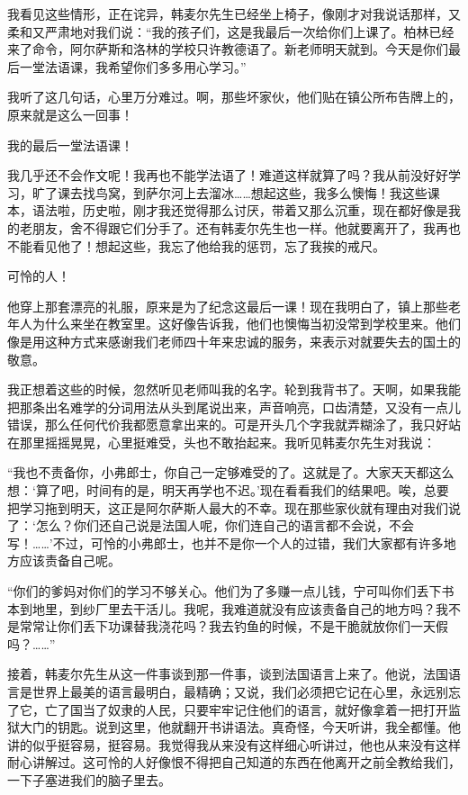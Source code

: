 \documentclass[12pt,UTF-8,openany]{ctexbook}
\begin{document}
\begin{normalsize}
    我看见这些情形，正在诧异，韩麦尔先生已经坐上椅子，像刚才对我说话那样，又柔和又严肃地对我们说：“我的孩子们，这是我最后一次给你们上课了。柏林已经来了命令，阿尔萨斯和洛林的学校只许教德语了。新老师明天就到。今天是你们最后一堂法语课，我希望你们多多用心学习。”
    
    我听了这几句话，心里万分难过。啊，那些坏家伙，他们贴在镇公所布告牌上的，原来就是这么一回事！
    
    我的最后一堂法语课！
    
    我几乎还不会作文呢！我再也不能学法语了！难道这样就算了吗？我从前没好好学习，旷了课去找鸟窝，到萨尔河上去溜冰……想起这些，我多么懊悔！我这些课本，语法啦，历史啦，刚才我还觉得那么讨厌，带着又那么沉重，现在都好像是我的老朋友，舍不得跟它们分手了。还有韩麦尔先生也一样。他就要离开了，我再也不能看见他了！想起这些，我忘了他给我的惩罚，忘了我挨的戒尺。
    
    可怜的人！
    
    他穿上那套漂亮的礼服，原来是为了纪念这最后一课！现在我明白了，镇上那些老年人为什么来坐在教室里。这好像告诉我，他们也懊悔当初没常到学校里来。他们像是用这种方式来感谢我们老师四十年来忠诚的服务，来表示对就要失去的国土的敬意。
    
    我正想着这些的时候，忽然听见老师叫我的名字。轮到我背书了。天啊，如果我能把那条出名难学的分词用法从头到尾说出来，声音响亮，口齿清楚，又没有一点儿错误，那么任何代价我都愿意拿出来的。可是开头几个字我就弄糊涂了，我只好站在那里摇摇晃晃，心里挺难受，头也不敢抬起来。我听见韩麦尔先生对我说：
    
    “我也不责备你，小弗郎士，你自己一定够难受的了。这就是了。大家天天都这么想：‘算了吧，时间有的是，明天再学也不迟。’现在看看我们的结果吧。唉，总要把学习拖到明天，这正是阿尔萨斯人最大的不幸。现在那些家伙就有理由对我们说了：‘怎么？你们还自己说是法国人呢，你们连自己的语言都不会说，不会写！……’不过，可怜的小弗郎士，也并不是你一个人的过错，我们大家都有许多地方应该责备自己呢。
    
    “你们的爹妈对你们的学习不够关心。他们为了多赚一点儿钱，宁可叫你们丢下书本到地里，到纱厂里去干活儿。我呢，我难道就没有应该责备自己的地方吗？我不是常常让你们丢下功课替我浇花吗？我去钓鱼的时候，不是干脆就放你们一天假吗？……”
    
    接着，韩麦尔先生从这一件事谈到那一件事，谈到法国语言上来了。他说，法国语言是世界上最美的语言最明白，最精确；又说，我们必须把它记在心里，永远别忘了它，亡了国当了奴隶的人民，只要牢牢记住他们的语言，就好像拿着一把打开监狱大门的钥匙。说到这里，他就翻开书讲语法。真奇怪，今天听讲，我全都懂。他讲的似乎挺容易，挺容易。我觉得我从来没有这样细心听讲过，他也从来没有这样耐心讲解过。这可怜的人好像恨不得把自己知道的东西在他离开之前全教给我们，一下子塞进我们的脑子里去。
    

\end{normalsize}
\end{document}
